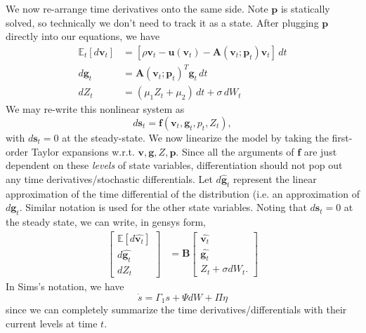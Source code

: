\documentclass[12 pt, oneside]{article}
\theoremstyle{definition}
\theoremstyle{definition}
\theoremstyle{definition}
\newcommand{\bff}{\mathbf{f}}
\newcommand{\bfg}{\mathbf{g}}
\newcommand{\bfp}{\mathbf{p}}
\newcommand{\bfs}{\mathbf{s}}
\newcommand{\bfu}{\mathbf{u}}
\newcommand{\bfv}{\mathbf{v}}
\newcommand{\bfA}{\mathbf{A}}
\newcommand{\bfB}{\mathbf{B}}
\newcommand{\E}{\mathbb{E}}
\begin{document}
We now re-arrange time derivatives onto the same side. Note $\bfp$ is statically solved, so technically we don't need to track it as a state. After plugging $\bfp$ directly into our equations, we have
\begin{align*}
 \E_t[d\bfv_t] & = \left[\rho \bfv_t - \bfu(\bfv_t) - \bfA(\bfv_t;\bfp_t) \bfv_t\right] \,dt\\
d\bfg_t & = \bfA(\bfv_t;\bfp_t)^T\bfg_t\,dt\\
dZ_t & = (\mu_1 Z_t+\mu_2)\,dt + \sigma\, dW_t
\end{align*}
We may re-write this nonlinear system as
\[d\bfs_t = \bff(\bfv_t, \bfg_t, p_t, Z_t), \]
with $d\bfs_t = 0$ at the steady-state. We now linearize the model by taking the first-order Taylor expansions w.r.t. $\bfv, \bfg, Z, \bfp$. Since all the arguments of $\bff$ are just dependent on these \textit{levels} of state variables, differentiation should not pop out any time derivatives/stochastic differentials. Let $d\hat{\bfg}_t$ represent the linear approximation of the time differential of the distribution (i.e. an approximation of $d\bfg_t$. Similar notation is used for the other state variables. Noting that $d\bfs_t = 0$ at the steady state, we can write, in gensys form,
\begin{align*}
\begin{bmatrix}
\E[d\hat{\bfv_t}]\\
d\hat{\bfg_t}\\
dZ_t
\end{bmatrix} & = \bfB\begin{bmatrix}\hat{\bfv_t}\\ \hat{\bfg_t}\\ Z_t + \sigma dW_t.
\end{bmatrix}
\end{align*}
In Sims's notation, we have
\[ \dot{s} = \Gamma_1 s + \Psi dW + \Pi \eta  \]
since we can completely summarize the time derivatives/differentials with their current levels at time $t$.
\end{document}
